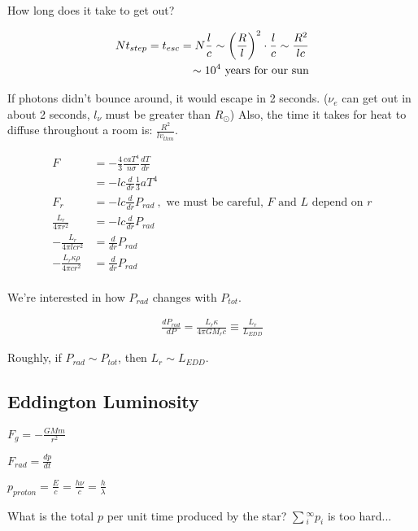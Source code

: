 How long does it take to get out? 

\begin{align}
Nt_{step} = t_{esc} = N\frac{l}{c} \sim \left( \frac{R}{l} \right)^2 \cdot \frac{l}{c} \sim \frac{R^2}{lc}\\
\sim 10^4 \text{ years for our sun}
\end{align}

If photons didn't bounce around, it would escape in 2 seconds. ($\nu_e$ can get out in about 2 seconds, $l_\nu$ must be greater than $R_\odot$) Also, the time it takes for heat to diffuse throughout a room is: $\frac{R^2}{lv_{thm}}$.

\begin{align}
F &= -\frac{4}{3}\frac{caT^4}{n \sigma} \frac{dT}{dr}\\
&= -lc \frac{d}{dr}\frac{1}{3}aT^4\\
F_r &= -lc\frac{d}{dr}P_{rad}~,\text{ we must be careful, $F$ and $L$ depend on $r$}\\
\frac{L_r}{4\pi r^2} &= -lc \frac{d}{dr}P_{rad}\\
-\frac{L_r}{4\pi lc r^2} &= \frac{d}{dr}P_{rad}\\
-\frac{L_r \kappa \rho}{4\pi c r^2} &= \frac{d}{dr}P_{rad}\\
\end{align}

We're interested in how $P_{rad}$ changes with $P_{tot}$. 

\begin{align}
\frac{dP_{rad}}{dP} = \frac{L_r \kappa}{4 \pi G M_r c} \equiv \frac{L_r}{L_{EDD}}
\end{align}

Roughly, if $P_{rad} \sim P_{tot}$, then $L_r \sim L_{EDD}$.

\subsection{Eddington Luminosity}

\begin{list}{}{}
\item $F_g = -\frac{GMm}{r^2}$
\item $F_{rad} = \frac{dp}{dt}$
\item $p_{proton} = \frac{E}{c} = \frac{h \nu}{c} = \frac{h}{\lambda}$
\end{list}

What is the total $p$ per unit time produced by the star? $\sum\limits{_i^\infty} p_i $ is too hard...

